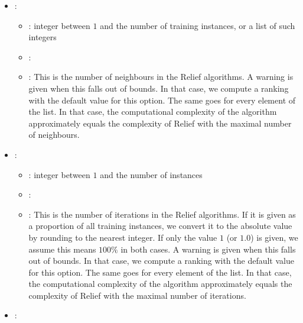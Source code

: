 \begin{itemize}
    \item {}:
           \begin{itemize}
                \item \optionPossibleValues{}: integer between $1$ and the number of training instances, or a list of such integers
                \item \optionDefaultValue{}: 
                \item \optionDescrption{}: This is the number of neighbours in the Relief algorithms. A warning is given
                                           when this falls out of bounds. In that case, we compute a ranking with the default value for this option.
                                           The same goes for every element of the list. In that case, the computational complexity of the algorithm
                                           approximately equals the complexity of Relief with the maximal number of neighbours.
           \end{itemize}
    \item {}:
           \begin{itemize}
                \item \optionPossibleValues{}: integer between $1$ and the number of instances
                \item \optionDefaultValue{}: 
                \item \optionDescrption{}: This is the number of iterations in the Relief algorithms. If it is given as a proportion
                                           of all training instances, we convert it to the absolute value by rounding to the nearest integer.
                                           If only the value $1$ (or $1.0$) is given, we assume this means $100\%$ in both cases. A warning is given
                                           when this falls out of bounds. In that case, we compute a ranking with the default value for this option.
                                           The same goes for every element of the list. In that case, the computational complexity of the algorithm
                                           approximately equals the complexity of Relief with the maximal number of iterations.
           \end{itemize}
    \item {}:
           \begin{itemize}

\end{itemize}
\end{itemize}
